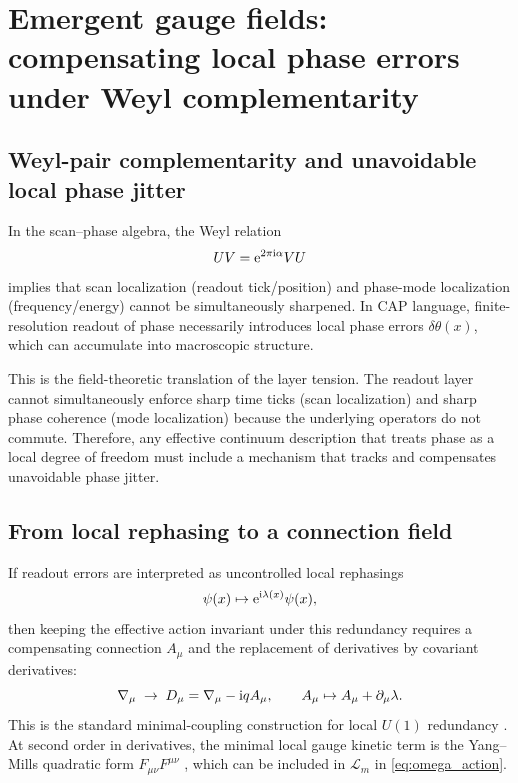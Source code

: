 \section{Emergent gauge fields: compensating local phase errors under Weyl complementarity}
\label{sec:gauge_fields}

\subsection{Weyl-pair complementarity and unavoidable local phase jitter}
\label{subsec:weyl_jitter}

In the scan--phase algebra, the Weyl relation
\begin{equation}
  UV = \mathrm{e}^{2\pi \mathrm{i} \alpha} VU
\end{equation}
implies that scan localization (readout tick/position) and phase-mode localization (frequency/energy) cannot be simultaneously sharpened. In CAP language, finite-resolution readout of phase necessarily introduces local phase errors $\delta\theta(x)$, which can accumulate into macroscopic structure.

This is the field-theoretic translation of the layer tension. The readout layer cannot simultaneously enforce sharp time ticks (scan localization) and sharp phase coherence (mode localization) because the underlying operators do not commute. Therefore, any effective continuum description that treats phase as a local degree of freedom must include a mechanism that tracks and compensates unavoidable phase jitter.

\subsection{From local rephasing to a connection field}
\label{subsec:gauge_connection}

If readout errors are interpreted as uncontrolled local rephasings
\begin{equation}
  \psi(x) \mapsto \mathrm{e}^{\mathrm{i} \lambda(x)}\psi(x),
\end{equation}
then keeping the effective action invariant under this redundancy requires a compensating connection $A_{\mu}$ and the replacement of derivatives by covariant derivatives:
\begin{equation}
  \nabla_{\mu} \;\to\; D_{\mu} = \nabla_{\mu} - \mathrm{i} q A_{\mu},
  \qquad
  A_{\mu} \mapsto A_{\mu} + \partial_{\mu}\lambda .
\end{equation}
This is the standard minimal-coupling construction for local $U(1)$ redundancy \cite{PeskinSchroeder1995,Nakahara2003}.
At second order in derivatives, the minimal local gauge kinetic term is the Yang--Mills quadratic form $F_{\mu\nu}F^{\mu\nu}$ \cite{YangMills1954,WuYang1975}, which can be included in $\mathcal{L}_m$ in \eqref{eq:omega_action}.

